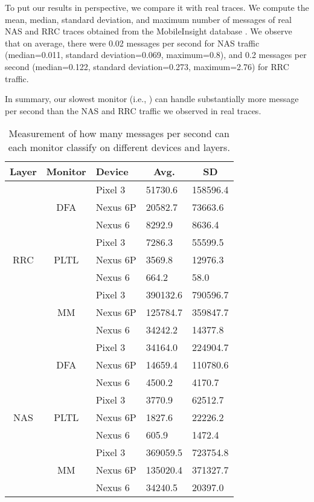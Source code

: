To put our results in perspective, we compare it with real traces.
We compute the mean, median, standard deviation, and
maximum number of messages of real NAS and RRC traces obtained from the
MobileInsight database \cite{mobile_insight}.
We observe that on average, there were 0.02 messages per second
for NAS traffic (median=0.011, standard deviation=0.069, maximum=0.8),
and 0.2 messages per second (median=0.122, standard deviation=0.273, maximum=2.76)
for RRC traffic.

In summary,
our slowest monitor (i.e., \pltl) can handle substantially more message
per second than the NAS and RRC traffic we observed in real traces.

\begin{table}[h!]
  \centering

  \begin{tabular}{|c|c|l|l|l|}
  \hline
  \textbf{Layer} & \textbf{Monitor} & \textbf{Device} & \multicolumn{1}{c|}{\textbf{Avg.}} & \multicolumn{1}{c|}{\textbf{SD}} \\ \hline
  \multirow{9}{*}{RRC} & \multirow{3}{*}{DFA} & Pixel 3 & 51730.6 & 158596.4 \\ \cline{3-5}
   &  & Nexus 6P & 20582.7 & 73663.6 \\ \cline{3-5}
   &  & Nexus 6 & 8292.9 & 8636.4 \\ \cline{2-5}
   & \multirow{3}{*}{PLTL} & Pixel 3 & 7286.3 & 55599.5 \\ \cline{3-5}
   &  & Nexus 6P & 3569.8 & 12976.3 \\ \cline{3-5}
   &  & Nexus 6 & 664.2 & 58.0 \\ \cline{2-5}
   & \multirow{3}{*}{MM} & Pixel 3 & 390132.6 & 790596.7 \\ \cline{3-5}
   &  & Nexus 6P & 125784.7 & 359847.7 \\ \cline{3-5}
   &  & Nexus 6 & 34242.2 & 14377.8 \\ \hline
  \multirow{9}{*}{NAS} & \multirow{3}{*}{DFA} & Pixel 3 & 34164.0 & 224904.7 \\ \cline{3-5}
   &  & Nexus 6P & 14659.4 & 110780.6 \\ \cline{3-5}
   &  & Nexus 6 & 4500.2 & 4170.7 \\ \cline{2-5}
   & \multirow{3}{*}{PLTL} & Pixel 3 & 3770.9 & 62512.7 \\ \cline{3-5}
   &  & Nexus 6P & 1827.6 & 22226.2 \\ \cline{3-5}
   &  & Nexus 6 & 605.9 & 1472.4 \\ \cline{2-5}
   & \multirow{3}{*}{MM} & Pixel 3 & 369059.5 & 723754.8 \\ \cline{3-5}
   &  & Nexus 6P & 135020.4 & 371327.7 \\ \cline{3-5}
   &  & Nexus 6 & 34240.5 & 20397.0 \\ \hline
  \end{tabular}
\caption{Measurement of how many messages per second can each monitor classify on different devices and layers.}
\label{tab:message_per_second_overall}
\end{table}

